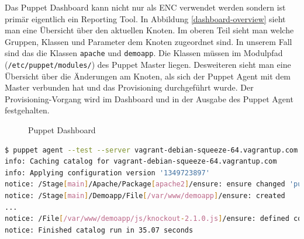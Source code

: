 \documentclass[12pt,a4paper,ngerman]{article}
\begin{document}
Das Puppet Dashboard kann nicht nur als ENC verwendet werden sondern ist primär eigentlich ein Reporting Tool. In Abbildung \ref{dashboard-overview} sieht man eine Übersicht über den aktuellen Knoten. Im oberen Teil sieht man welche Gruppen, Klassen und Parameter dem Knoten zugeordnet sind. In unserem Fall sind das die Klassen \lstinline$apache$ und \lstinline$demoapp$. Die Klassen müssen im Modulpfad (\lstinline$/etc/puppet/modules/$) des Puppet Master liegen. Desweiteren sieht man eine Übersicht über die Änderungen am Knoten, als sich der Puppet Agent mit dem Master verbunden hat und das Provisioning durchgeführt wurde. Der Provisioning-Vorgang wird im Dashboard und in der Ausgabe des Puppet Agent festgehalten.
\begin{figure}[ht]
\centering
{}
\caption{Puppet Dashboard}
\label{dashboard}
\end{figure}

\begin{lstlisting}[language=sh,caption=Puppet Agent Run durchführen , label=puppet-agent-run]
$ puppet agent --test --server vagrant-debian-squeeze-64.vagrantup.com
info: Caching catalog for vagrant-debian-squeeze-64.vagrantup.com
info: Applying configuration version '1349723897'
notice: /Stage[main]/Apache/Package[apache2]/ensure: ensure changed 'purged' to 'present'
notice: /Stage[main]/Demoapp/File[/var/www/demoapp]/ensure: created
...
notice: /File[/var/www/demoapp/js/knockout-2.1.0.js]/ensure: defined content as '{md5}235475c7c3dc43c7cb7f6125be536c32'
notice: Finished catalog run in 35.07 seconds
\end{lstlisting}
\end{document}
